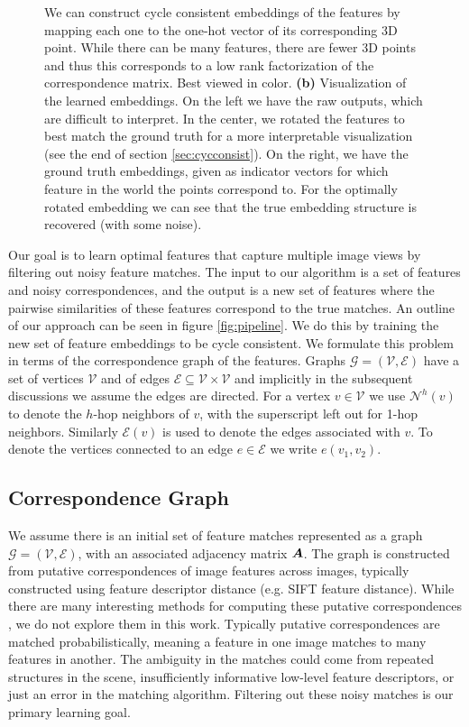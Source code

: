 \documentclass{article} %
\begin{document}
\begin{figure}[t]
{  We can construct cycle consistent embeddings of the features by mapping each one to the one-hot vector of its corresponding 3D point.
  While there can be many features, there are fewer 3D points and thus this corresponds to a low rank factorization of the correspondence matrix.
  Best viewed in color.
  \textbf{(b)} Visualization of the learned embeddings.
  On the left we have the raw outputs, which are difficult to interpret.
  In the center, we rotated the features to best match the ground truth for a more interpretable visualization (see the end of section \ref{sec:cycconsist}).
  On the right, we have the ground truth embeddings, given as indicator vectors for which feature in the world the points correspond to.
  For the optimally rotated embedding we can see that the true embedding structure is recovered (with some noise).
}
\label{fig:1}
\end{figure}

Our goal is to learn optimal features that capture multiple image views by filtering out noisy feature matches.
The input to our algorithm is a set of features and noisy correspondences, and the output is a new set of features where the pairwise similarities of these features correspond to the true matches.
An outline of our approach can be seen in figure \ref{fig:pipeline}.
We do this by training the new set of feature embeddings to be cycle consistent.
We formulate this problem in terms of the correspondence graph of the features.
Graphs $\mathcal{G} = (\mathcal{V}, \mathcal{E})$ have a set of vertices $\mathcal{V}$ and of edges $\mathcal{E} \subseteq \mathcal{V} \times \mathcal{V}$ and implicitly in the subsequent discussions we assume the edges are directed.
For a vertex $v \in \mathcal{V}$ we use $\mathcal{N}^{h}(v)$ to denote the $h$-hop neighbors of $v$, with the superscript left out for 1-hop neighbors.
Similarly $\mathcal{E}(v)$ is used to denote the edges associated with $v$.
To denote the vertices connected to an edge $e \in \mathcal{E}$ we write $e(v_1, v_2)$.
\subsection{Correspondence Graph} \label{sec:corrgraph}
We assume there is an initial set of feature matches represented as a graph $\mathcal{G} = (\mathcal{V}, \mathcal{E})$, with an associated adjacency matrix ${\bm{A}}$.
The graph is constructed from putative correspondences of image features across images, typically constructed using feature descriptor distance (e.g. SIFT feature distance).
While there are many interesting methods for computing these putative correspondences \citep{suh2015subgraph, yi2018learning}, we do not explore them in this work.
Typically putative correspondences are matched probabilistically, meaning a feature in one image matches to many features in another.
The ambiguity in the matches could come from repeated structures in the scene, insufficiently informative low-level feature descriptors, or just an error in the matching algorithm.
Filtering out these noisy matches is our primary learning goal.
\end{document}
